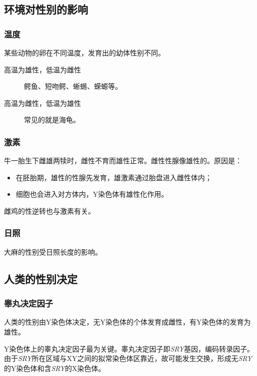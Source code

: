 \subsection{环境对性别的影响}

\subsubsection{温度}

某些动物的卵在不同温度，发育出的幼体性别不同。

\begin{description}
	\item[高温为雄性，低温为雌性] 鳄鱼、短吻鳄、蜥蜴、蝾螈等。
	\item[高温为雌性，低温为雄性] 常见的就是海龟。
\end{description}

\subsubsection{激素}

牛一胎生下雌雄两犊时，雌性不育而雄性正常。雌性性腺像雄性的。原因是：
\begin{itemize}
	\item 在胚胎期，雄性的性腺先发育，雄激素通过胎盘进入雌性体内；
	\item 细胞也会进入对方体内，Y染色体有雄性化作用。
\end{itemize}

雌鸡的性逆转也与激素有关。

\subsubsection{日照}

大麻的性别受日照长度的影响。

\subsection{人类的性别决定}

\subsubsection{睾丸决定因子}

人类的性别由Y染色体决定，无Y染色体的个体发育成雌性，有Y染色体的发育为雄性。

Y染色体上的睾丸决定因子最为关键。睾丸决定因子即\textit{SRY}基因，编码转录因子。由于\textit{SRY}所在区域与XY之间的拟常染色体区靠近，故可能发生交换，形成无\textit{SRY}的Y染色体和含\textit{SRY}的X染色体。

